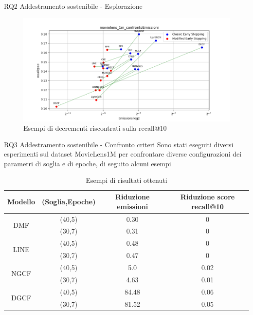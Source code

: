 \begin{frame}{RQ2 Addestramento sostenibile - Esplorazione}
 \begin{figure}[H]
    \centering
    \includegraphics[scale=0.5]{images/recall@10_movielens_1m_comparison.png}
    \caption{Esempi di decrementi riscontrati sulla recall@10}
 \end{figure}
\end{frame}



\begin{frame}{RQ3 Addestramento sostenibile - Confronto criteri}
    Sono stati eseguiti diversi esperimenti sul dataset MovieLens1M per confrontare diverse configurazioni dei parametri di soglia e di epoche, di seguito alcuni esempi\\
    \begin{table}[H]
        \centering
        \begin{tabular}{|c|c|c|c|}
            \hline
            \textbf{Modello} & \textbf{(Soglia,Epoche)} & \textbf{Riduzione emissioni} & \textbf{Riduzione score recall@10} \\ \hline
            \multirow{2}{*}{DMF} & (40,5) & 0.30 & 0 \\ \cline{2-4}
                                 & (30,7) &  0.31 & 0 \\ \hline
            \multirow{2}{*}{LINE} & (40,5) & 0.48 & 0 \\ \cline{2-4}
                                  & (30,7) & 0.47 & 0 \\ \hline
            \multirow{2}{*}{NGCF} & (40,5) & 5.0 & 0.02 \\ \cline{2-4}
                                  & (30,7) &  4.63 & 0.01 \\ \hline
            \multirow{2}{*}{DGCF} & (40,5) & 84.48 & 0.06 \\ \cline{2-4}
                                  & (30,7) & 81.52 &  0.05 \\ \hline
        \end{tabular}
        \caption{Esempi di risultati ottenuti}
    \end{table}
\end{frame}



